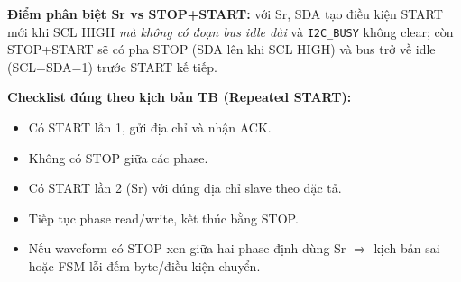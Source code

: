 \textbf{Điểm phân biệt Sr vs STOP+START:} với Sr, SDA tạo điều kiện START mới khi SCL HIGH \emph{mà không có đoạn bus idle dài} và \texttt{I2C\_BUSY} không clear; còn STOP+START sẽ có pha STOP (SDA lên khi SCL HIGH) và bus trở về idle (SCL=SDA=1) trước START kế tiếp.

\textbf{Checklist đúng theo kịch bản TB (Repeated START):}
\begin{itemize}[leftmargin=1.2cm]
    \item Có START lần 1, gửi địa chỉ và nhận ACK.
    \item Không có STOP giữa các phase.
    \item Có START lần 2 (Sr) với đúng địa chỉ slave theo đặc tả.
    \item Tiếp tục phase read/write, kết thúc bằng STOP.
    \item Nếu waveform có STOP xen giữa hai phase định dùng Sr $\Rightarrow$ kịch bản sai hoặc FSM lỗi đếm byte/điều kiện chuyển.
\end{itemize}

